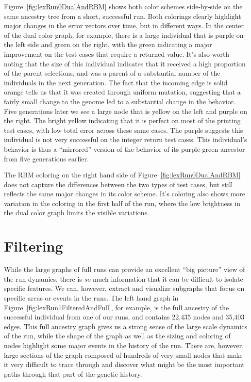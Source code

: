 \documentclass{sig-alternate}
\begin{document}
Figure~\ref{fig:lexRun0DualAndRBM} shows both color schemes side-by-side on the same
ancestry tree from a short, successful run. Both colorings clearly highlight major
changes in the error vectors over time, but in different ways. In the center of the 
dual color graph, for example, there is a large individual that is purple on the left
side and green on the right, with the green indicating a major improvement on the
test cases that require a returned value. It's also worth noting that the size of
this individual indicates that it received a high proportion of the parent selections,
and was a parent of a substantial number of the individuals in the next generation.
The fact that the incoming edge is solid orange tells us that it was created through
uniform mutation, suggesting that a fairly small change to the genome led to a
substantial change in the behavior. Five generations later we see a large node that
is yellow on the left and purple on the right. The bright yellow indicating that 
it is perfect on most of the printing test cases, with low total error across these same cases.
The purple suggests this individual is not very successful
on the integer return test cases. This individual's behavior is thus a ``mirrored'' 
version of the behavior of its purple-green ancestor from five generations earlier.

The RBM coloring on the right hand side of Figure~\ref{fig:lexRun0DualAndRBM} does not
capture the differences between the two types of test cases, but still reflects the
same major changes in its color scheme. It's coloring also shows more variation in the
coloring in the first half of the run, where the low brightness in the dual color
graph limits the visible variations.

\section{Filtering}
\label{sec:filtering}

While the large graphs of full runs can provide an excellent ``big picture'' 
view of the run dynamics, there is \emph{so} much information that it can be
difficult to isolate specific features. We can, however, extract and visualize
subgraphs that focus on specific areas or events in the runs. The left hand 
graph in Figure~\ref{fig:lexRun1FilteredAndFull}, for example, is the full 
ancestry of the
successful individual from one of our runs, and contains 22,435 nodes
and 35,403 edges. This full ancestry graph gives us a strong sense of the 
large scale dynamics of the run, while the shape of the graph as well as the sizing and 
coloring of nodes highlight some major events in the history of the run. There 
are, however, large sections of the graph composed of hundreds of very small 
nodes that make it very difficult to trace through and discover what might be 
the most important paths through that part of the genetic history.
\end{document}
